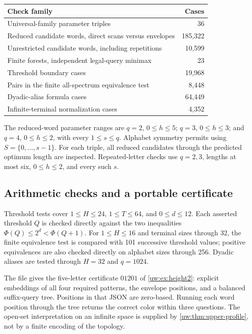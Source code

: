 \documentclass[11pt,letterpaper]{article}
\numberwithin{equation}{section}
\theoremstyle{definition}
\theoremstyle{remark}
\theoremstyle{definition}
\begin{document}
\begin{center}
\begin{tabular}{@{}p{}r@{}}
\toprule
Check family & Cases\\
\midrule
Universal-family parameter triples & 36\\
Reduced candidate words, direct scans versus envelopes & 185,322\\
Unrestricted candidate words, including repetitions & 10,599\\
Finite forests, independent legal-query minimax & 23\\
Threshold boundary cases & 19,968\\
Pairs in the finite all-spectrum equivalence test & 8,448\\
Dyadic-alias formula cases & 64,449\\
Infinite-terminal normalization cases & 4,352\\
\bottomrule
\end{tabular}
\end{center}

The reduced-word parameter ranges are $q=2$, $0\le h\le5$;
$q=3$, $0\le h\le3$; and $q=4$, $0\le h\le2$, with every
$1\le s\le q$. Alphabet symmetry permits using $S=\{0,\ldots,s-1\}$.
For each triple, all reduced candidates through the predicted optimum length
are inspected. Repeated-letter checks use $q=2,3$, lengths at most six,
$0\le h\le2$, and every such $s$.

\subsection{Arithmetic checks and a portable certificate}
Threshold tests cover $1\le H\le24$, $1\le T\le64$, and $0\le d\le12$.
Each asserted threshold $Q$ is checked directly against the two inequalities
$\Phi(Q)\le2^d<\Phi(Q+1)$. For $1\le H\le16$ and terminal sizes through 32,
the finite equivalence test is compared with 101 successive threshold values;
positive equivalences are also checked directly on alphabet sizes through 256.
Dyadic aliases are tested through $H=32$ and $q=1024$.

The file  gives the five-letter certificate
$01201$ of \cref{uw:ex:height2}: explicit embeddings of all four required
patterns, the envelope positions, and a balanced suffix-query tree. Positions
in that JSON are zero-based. Running each word position through the tree
returns the correct color within three questions. The open-set interpretation
on an infinite space is supplied by \cref{uw:thm:upper-profile}, not by a finite
encoding of the topology.
\end{document}
